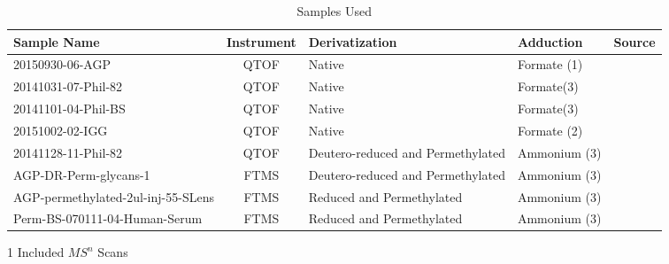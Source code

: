     \renewcommand{\arraystretch}{1.5}
    \begin{table}
        \caption{Samples Used}\label{tab:sample_overview}
        \centering
        \begin{threeparttable}
        \begin{tabular}{p{4.1cm} | c | p{3cm} | p{3cm} | c}
            Sample Name & Instrument & Derivatization & Adduction & Source\\
            \hline
            20150930-06-AGP & QTOF & Native & Formate (1) & \cite{Khatri2016a}\\
            20141031-07-Phil-82 & QTOF & Native & Formate(3) & \cite{Khatri2016a}\\
            20141101-04-Phil-BS & QTOF & Native & Formate(3) & \cite{Khatri2016a}\\
            20151002-02-IGG & QTOF & Native & Formate (2) & \cite{Khatri2016b}\\
            20141128-11-Phil-82\tnote{1} & QTOF &
                Deutero-reduced and Permethylated & Ammonium (3) & \cite{Khatri2016a}\\
            AGP-DR-Perm-glycans-1\tnote{1} & FTMS &
                Deutero-reduced and Permethylated & Ammonium (3) & \cite{Khatri2016a}\\
            AGP-permethylated-2ul-inj-55-SLens\tnote{1} & FTMS &
                Reduced and Permethylated & Ammonium (3) & \cite{Khatri2016a}\\
            Perm-BS-070111-04-Human-Serum\tnote{1} & FTMS &
                Reduced and Permethylated & Ammonium (3) & \cite{Yu2013}\\
        \end{tabular}
        \begin{tablenotes}
            \item[1] Included $MS^n$ Scans
        \end{tablenotes}
        \end{threeparttable}
    \end{table}
    \renewcommand{\arraystretch}{1.0}